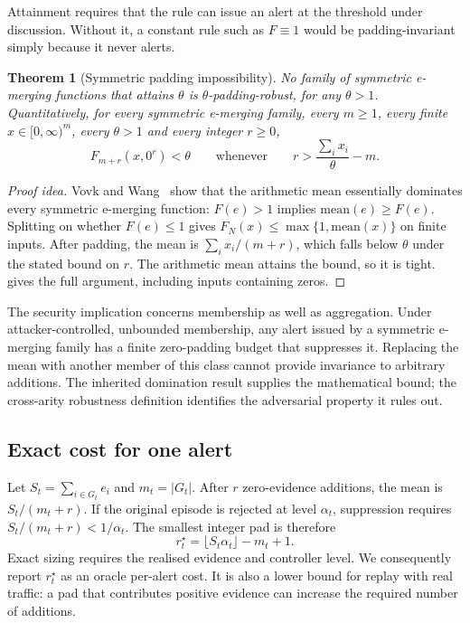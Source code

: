 \documentclass[conference]{IEEEtran}
\newtheorem{theorem}{Theorem}
\newcommand{\alphat}{\alpha_t}
\begin{document}
Attainment requires that the rule can issue an alert at the threshold under discussion. Without
it, a constant rule such as $F\equiv1$ would be padding-invariant simply because it never alerts.

\begin{theorem}[Symmetric padding impossibility]\label{thm:padding}
No family of symmetric e-merging functions that attains $\theta$ is $\theta$-padding-robust, for any
$\theta>1$. Quantitatively, for every symmetric e-merging family, every $m\ge1$, every finite
$x\in[0,\infty)^m$, every $\theta>1$ and every integer $r\ge0$,
\[
F_{m+r}(x,0^{r})<\theta\qquad\text{whenever}\qquad r>\frac{\sum_i x_i}{\theta}-m .
\]
\end{theorem}

\begin{proof}[Proof idea]
Vovk and Wang~\cite[Prop.~3.1]{vovk2021evalues} show that the arithmetic mean essentially dominates
every symmetric e-merging function: $F(e)>1$ implies $\mathrm{mean}(e)\ge F(e)$. Splitting on
whether $F(e)\le1$ gives $F_N(x)\le\max\{1,\mathrm{mean}(x)\}$ on finite inputs. After padding,
the mean is $\sum_i x_i/(m+r)$, which falls below $\theta$ under the stated bound on $r$.
The arithmetic mean attains the bound, so it is tight.  gives the full argument,
including inputs containing zeros.
\end{proof}

The security implication concerns membership as well as aggregation. Under attacker-controlled,
unbounded membership, any alert issued by a symmetric e-merging family has a finite zero-padding
budget that suppresses it. Replacing the mean with another member of this class cannot provide
invariance to arbitrary additions. The inherited domination result supplies the mathematical bound;
the cross-arity robustness definition identifies the adversarial property it rules out.

\subsection{Exact cost for one alert}\label{sec:paddingcost}

Let $S_t=\sum_{i\in G_t}e_i$ and $m_t=\lvert G_t\rvert$. After $r$ zero-evidence additions, the
mean is $S_t/(m_t+r)$. If the original episode is rejected at level $\alphat$, suppression requires
$S_t/(m_t+r)<1/\alphat$. The smallest integer pad is therefore
\begin{equation}\label{eq:rstar}
r^\star_t=\lfloor S_t\alphat\rfloor-m_t+1.
\end{equation}
Exact sizing requires the realised evidence and controller level. We consequently report
$r^\star_t$ as an oracle per-alert cost. It is also a lower bound for replay with real traffic:
a pad that contributes positive evidence can increase the required number of additions.
\end{document}
